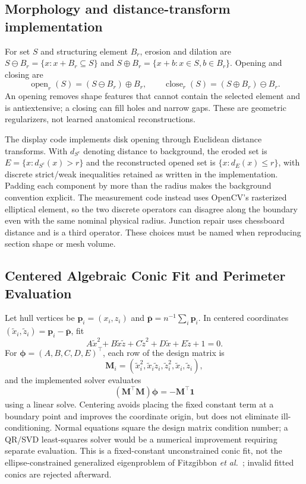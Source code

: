 \documentclass[11pt,a4paper]{article}
\numberwithin{equation}{section}
\begin{document}
\subsection{Morphology and distance-transform implementation}
For set $S$ and structuring element $B_r$, erosion and dilation are $S\ominus B_r=\{x:x+B_r\subseteq S\}$ and $S\oplus B_r=\{x+b:x\in S,b\in B_r\}$. Opening and closing are
\begin{equation}
\operatorname{open}_r(S)=(S\ominus B_r)\oplus B_r,\qquad
\operatorname{close}_r(S)=(S\oplus B_r)\ominus B_r.
\end{equation}
An opening removes shape features that cannot contain the selected element and is antiextensive; a closing can fill holes and narrow gaps. These are geometric regularizers, not learned anatomical reconstructions.

The display code implements disk opening through Euclidean distance transforms. With $d_{S^c}$ denoting distance to background, the eroded set is $E=\{x:d_{S^c}(x)>r\}$ and the reconstructed opened set is $\{x:d_E(x)\le r\}$, with discrete strict/weak inequalities retained as written in the implementation. Padding each component by more than the radius makes the background convention explicit. The measurement code instead uses OpenCV's rasterized elliptical element, so the two discrete operators can disagree along the boundary even with the same nominal physical radius. Junction repair uses chessboard distance and is a third operator. These choices must be named when reproducing section shape or mesh volume.

\subsection{Centered Algebraic Conic Fit and Perimeter Evaluation}
\label{subsec:conic_fit}
Let hull vertices be $\mathbf p_i=(x_i,z_i)$ and $\bar{\mathbf p}=n^{-1}\sum_i\mathbf p_i$. In centered coordinates $(\tilde x_i,\tilde z_i)=\mathbf p_i-\bar{\mathbf p}$, fit
\begin{equation}
A\tilde x^2+B\tilde x\tilde z+C\tilde z^2+D\tilde x+E\tilde z+1=0.
\end{equation}
For $\boldsymbol\phi=(A,B,C,D,E)^\top$, each row of the design matrix is
\begin{equation}
\mathbf M_i=(\tilde x_i^2,\tilde x_i\tilde z_i,\tilde z_i^2,\tilde x_i,\tilde z_i),
\end{equation}
and the implemented solver evaluates
\begin{equation}
(\mathbf M^\top\mathbf M)\boldsymbol\phi=-\mathbf M^\top\mathbf 1
\label{eq:conic_normal_equations}
\end{equation}
using a linear solve. Centering avoids placing the fixed constant term at a boundary point and improves the coordinate origin, but does not eliminate ill-conditioning. Normal equations square the design matrix condition number; a QR/SVD least-squares solver would be a numerical improvement requiring separate evaluation. This is a fixed-constant unconstrained conic fit, not the ellipse-constrained generalized eigenproblem of Fitzgibbon \emph{et al.}~\cite{fitzgibbon1999direct}; invalid fitted conics are rejected afterward.
\end{document}
